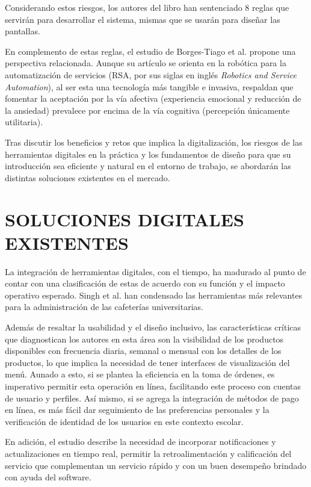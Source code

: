 Considerando estos riesgos, los autores del libro han sentenciado 8 reglas que servirán para desarrollar el sistema, mismas que se usarán para diseñar las pantallas. 

En complemento de estas reglas, el estudio de Borges-Tiago et al. \cite{borgestiago2025technology} propone una perspectiva relacionada. Aunque su artículo se orienta en la robótica para la automatización de servicios (RSA, por sus siglas en inglés \textit{Robotics and Service Automation}), al ser esta una tecnología más tangible e invasiva, respaldan que fomentar la aceptación por la vía afectiva (experiencia emocional y reducción de la ansiedad) prevalece por encima de la vía cognitiva (percepción únicamente utilitaria).

Tras discutir los beneficios y retos que implica la digitalización, los riesgos de las herramientas digitales en la práctica y los fundamentos de diseño para que su introducción sea eficiente y natural en el entorno de trabajo, se abordarán las distintas soluciones existentes en el mercado. 

\section{SOLUCIONES DIGITALES EXISTENTES}
La integración de herramientas digitales, con el tiempo, ha madurado al punto de contar con una clasificación de estas de acuerdo con su función y el impacto operativo esperado. Singh et al. \cite{singh2023cafeteria} han condensado las herramientas más relevantes para la administración de las cafeterías universitarias. 

Además de resaltar la usabilidad y el diseño inclusivo, las características críticas que diagnostican los autores en esta área son la visibilidad de los productos disponibles con frecuencia diaria, semanal o mensual con los detalles de los productos, lo que implica la necesidad de tener interfaces de visualización del menú. Aunado a esto, si se plantea la eficiencia en la toma de órdenes, es imperativo permitir esta operación en línea, facilitando este proceso con cuentas de usuario y perfiles. Así mismo, si se agrega la integración de métodos de pago en línea, es más fácil dar seguimiento de las preferencias personales y la verificación de identidad de los usuarios en este contexto escolar.  

En adición, el estudio describe la necesidad de incorporar notificaciones y actualizaciones en tiempo real, permitir la retroalimentación y calificación del servicio que complementan un servicio rápido y con un buen desempeño brindado con ayuda del software. 

